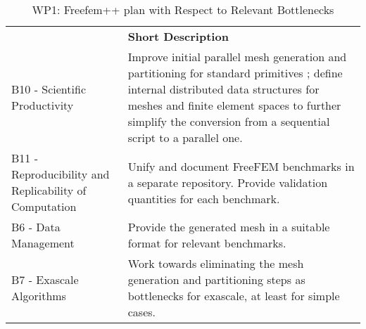 \begin{table}[h!]
    \centering
    
    

    \centering
    { 
        \setlength{\parindent}{0pt}
        \def\arraystretch{1.25}
        {
            \fontsize{9}{11}\selectfont
            \begin{tabular}{!{\color{numpexgray}\vrule}p{.25\linewidth}!{\color{numpexgray}\vrule}p{.6885\linewidth}!{\color{numpexgray}\vrule}}
    
     &  {\rule{0pt}{2.5ex}\color{white}\bf Short Description }\\ 
    
    B10 - Scientific Productivity & Improve initial parallel mesh generation and partitioning for standard primitives ; define internal distributed data structures for meshes and finite element spaces to further simplify the conversion from a sequential script to a parallel one. \\
    B11 - Reproducibility and Replicability of Computation & Unify and document FreeFEM benchmarks in a separate repository. Provide validation quantities for each benchmark. \\
    B6 - Data Management &  Provide the generated mesh in a suitable format for relevant benchmarks. \\
    B7 - Exascale Algorithms & Work towards eliminating the mesh generation and partitioning steps as bottlenecks for exascale, at least for simple cases. \\
\end{tabular}
        }
    }
    \caption{WP1: Freefem++ plan with Respect to Relevant Bottlenecks}
    \label{tab:WP1:Freefem++:bottlenecks}
\end{table}